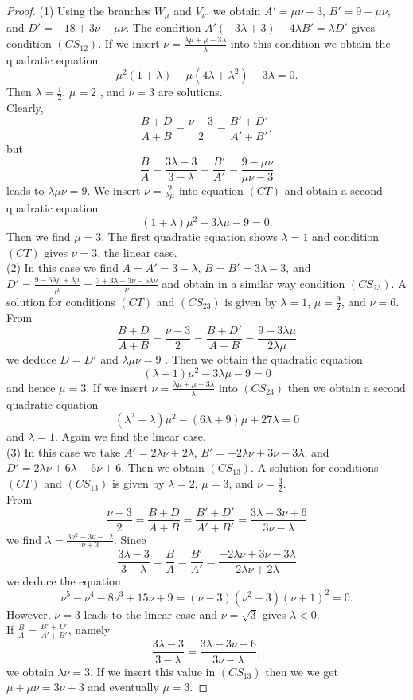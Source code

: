 \documentclass[10pt,a4paper]{amsart}
\begin{document}
\begin{proof}
(1) Using the branches 	$W_{\mu}$ and $V_{\nu}$, we obtain $A'= \mu \nu -3$, $B' = 9 -\mu \nu$, and $D'= -18 + 3 \nu + \mu \nu$. The condition $A'(-3\lambda +3) - 4\lambda B' = \lambda D'$ gives condition $(CS_{12})$. If we insert $\nu = \frac{\lambda \mu + \mu - 3 \lambda}{\lambda}$ into this condition we obtain the quadratic equation 
$$\mu^2 (1+ \lambda) - \mu(4 \lambda + \lambda^2) - 3\lambda  =0.$$
Then  $\lambda = \frac{1}{2} $, $\mu = 2$ , and $\nu =3$ are solutions.\\
Clearly, $$\frac{B+D}{A+B} = \frac{\nu -3}{2}= \frac{B'+D'}{A'+B'},$$  but $$\frac{B}{A} = \frac{3\lambda -3}{3 -\lambda} =  \frac{B'}{A'} = \frac{9 - \mu \nu}{\mu \nu -3}$$ leads to $\lambda \mu \nu = 9$. We insert $\nu = \frac{9}{\lambda \mu }$ into equation $(CT)$ and obtain a second quadratic  equation
$$(1+ \lambda)\mu^2  -3 \lambda \mu - 9  =0.$$ Then we find $\mu = 3$. The first quadratic equation shows $\lambda =1$ and condition $(CT)$ gives $\nu =3$, the linear case.\\
(2) In this case we find $A = A' = 3 -\lambda$, $B=B' = 3 \lambda  -3$, and $D' = \frac{9-6\lambda \mu + 3 \mu }{\mu} = 
\frac{3 + 3 \lambda + 3 \nu -5 \lambda \nu}{\nu}$ and obtain in a similar way condition $(CS_{23})$. A solution for conditions $(CT)$ and $(CS_{23})$ is given by $\lambda =1$, $\mu = \frac{9}{2}$, and $\nu =6$.\\
From $$\frac{B+D}{A+B} = \frac{\nu -3}{2} = \frac{B+D'}{A+B}= \frac{9-3\lambda \mu}{2 \lambda \mu}$$ we deduce $D=D'$ and $\lambda \mu \nu =9$ .  Then we obtain the quadratic equation
$$(\lambda +1)\mu^2 - 3\lambda \mu - 9 = 0$$ and hence $\mu =3$.
If we insert $\nu = \frac{\lambda \mu + \mu - 3 \lambda}{\lambda}$ into $(CS_{23})$ then we obtain a second quadratic equation
$$ (\lambda^2 + \lambda)\mu^2 - (6 \lambda +9)\mu  +27 \lambda =0$$ and $\lambda =1$.
 Again we find the linear case.\\
(3) In this case we take $A' = 2 \lambda \nu + 2 \lambda$, $B' = -2 \lambda \nu + 3 \nu - 3 \lambda$, and $D' = 2 \lambda \nu + 6 \lambda - 6 \nu +6$. Then we obtain $(CS_{13})$.  A solution for conditions $(CT)$ and $(CS_{13})$ is given by $\lambda =2$, $\mu = 3$, and $\nu = \frac{3}{2}$.\\
 From  $$ \frac{\nu -3}{2}=\frac{B+D}{A+B}= \frac{B'+D'}{A' +B'} = \frac{3 \lambda - 3 \nu +6}{3 \nu - \lambda}$$ we find $\lambda = \frac{3\nu^2 - 3\nu -12}{\nu +3}$.  Since $$\frac{3 \lambda -3}{3- \lambda} = \frac{B}{A} = \frac{B'}{A'}= \frac{- 2\lambda \nu + 3 \nu - 3 \lambda}{2 \lambda \nu + 2 \lambda }$$ we deduce the equation
$$\nu^5 - \nu^4 -8 \nu^3 + 15\nu +9 = (\nu -3)(\nu^2 -3)(\nu +1)^2=0.$$ However, $\nu =3$ leads to the linear case and $\nu = \sqrt{3}$ gives $\lambda < 0$.\\
If $\frac{B}{A} = \frac{B' +D'}{A'+B'}$, namely $$\frac{3 \lambda -3}{3- \lambda}= \frac{3 \lambda - 3 \nu +6}{3 \nu - \lambda},$$ we obtain $\lambda \nu =3$. If we insert this value in $(CS_{13})$ then we we get $\mu + \mu \nu = 3 \nu +3$ and eventually $\mu = 3$. 
\end{proof}
\end{document}
